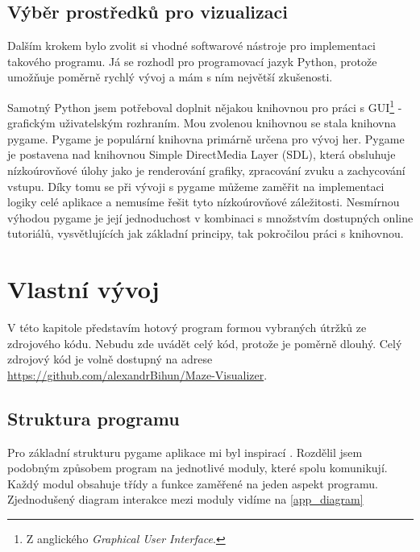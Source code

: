 \documentclass[12pt]{report}			%
\begin{document}
			\section{Výběr prostředků pro vizualizaci}
			Dalším krokem bylo zvolit si vhodné softwarové nástroje pro implementaci takového programu. Já se rozhodl pro programovací jazyk Python, protože umožňuje poměrně rychlý vývoj a  mám s ním největší zkušenosti.
			
			Samotný Python jsem potřeboval doplnit nějakou knihovnou pro práci s GUI\footnote{Z anglického \emph{Graphical User Interface}.} - grafickým uživatelským rozhraním. Mou zvolenou knihovnou se stala knihovna pygame. Pygame je populární knihovna primárně určena pro vývoj her.  
			Pygame je postavena nad knihovnou Simple DirectMedia Layer (SDL), která obsluhuje nízkoúrovňové úlohy jako je renderování grafiky, zpracování zvuku a zachycování vstupu. Díky tomu se při vývoji s pygame můžeme zaměřit na implementaci logiky celé aplikace a nemusíme řešit tyto nízkoúrovňové záležitosti.
			Nesmírnou výhodou pygame je její jednoduchost v kombinaci s množstvím dostupných online tutoriálů, vysvětlujících jak základní principy, tak pokročilou práci s knihovnou.
			\cite{pygame_intro} \cite{pygame_about}
			
		
		\chapter{Vlastní vývoj}
		V této kapitole představím hotový program formou vybraných útržků ze zdrojového kódu. Nebudu zde uvádět celý kód, protože je poměrně dlouhý. Celý zdrojový kód je volně dostupný na adrese \url{https://github.com/alexandrBihun/Maze-Visualizer}.
			\section{Struktura programu}
			Pro základní strukturu pygame aplikace mi byl inspirací \cite{yt_zelda}. Rozdělil jsem podobným způsobem program na jednotlivé moduly, které spolu komunikují. Každý modul obsahuje třídy a funkce zaměřené na jeden aspekt programu. Zjednodušený diagram interakce mezi moduly vidíme na \ref{app_diagram}
			
\end{document}

